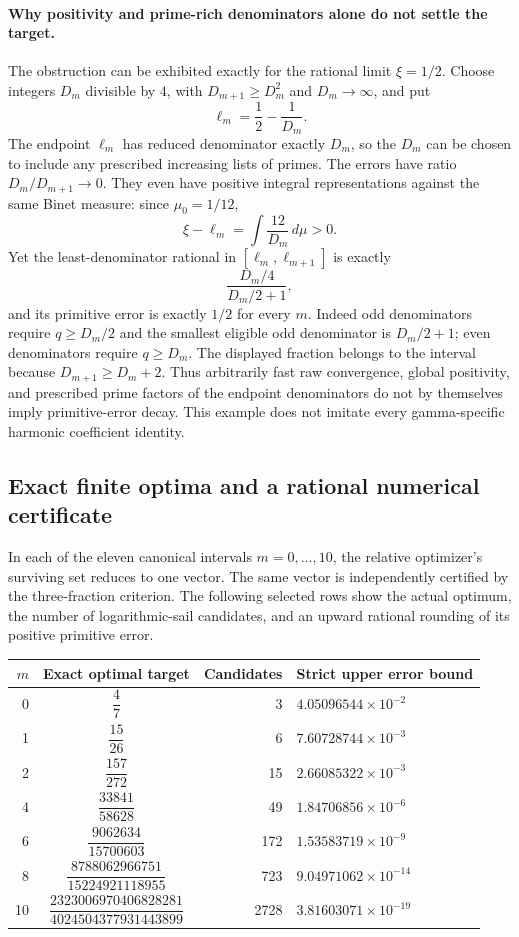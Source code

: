 \documentclass[11pt,a4paper]{article}
\theoremstyle{definition}
\theoremstyle{remark}
\begin{document}
\paragraph{Why positivity and prime-rich denominators alone do not settle the target.}
The obstruction can be exhibited exactly for the rational limit $\xi=1/2$.
Choose integers $D_m$ divisible by $4$, with
$D_{m+1}\ge D_m^2$ and $D_m\to\infty$, and put
\[
 \ell_m=\frac12-\frac1{D_m}.
\]
The endpoint $\ell_m$ has reduced denominator exactly $D_m$, so the
$D_m$ can be chosen to include any prescribed increasing lists of primes.
The errors have ratio $D_m/D_{m+1}\to0$. They even have positive integral
representations against the same Binet measure: since $\mu_0=1/12$,
\[
 \xi-\ell_m=\int\frac{12}{D_m}\,d\mu>0.
\]
Yet the least-denominator rational in
$[\ell_m,\ell_{m+1}]$ is exactly
\[
 \frac{D_m/4}{D_m/2+1},
\]
and its primitive error is exactly $1/2$ for every $m$.
Indeed odd denominators require $q\ge D_m/2$ and the smallest eligible
odd denominator is $D_m/2+1$; even denominators require $q\ge D_m$.
The displayed fraction belongs to the interval because
$D_{m+1}\ge D_m+2$.
Thus arbitrarily fast raw convergence, global positivity, and prescribed
prime factors of the endpoint denominators do not by themselves imply
primitive-error decay. This example does not imitate every
gamma-specific harmonic coefficient identity.



\subsection{Exact finite optima and a rational numerical certificate}
In each of the eleven canonical intervals $m=0,\ldots,10$, the
relative optimizer's surviving set reduces to one vector.
The same vector is independently certified by the three-fraction
criterion. The following selected rows show the actual optimum,
the number of logarithmic-sail candidates, and an upward rational
rounding of its positive primitive error.

\begin{center}
\small
\renewcommand{\arraystretch}{1.55}
\begin{tabular}{@{}rcrl@{}}
\toprule
$m$ & Exact optimal target & Candidates & Strict upper error bound\\
\midrule
0 & $\dfrac{4}{7}$ & 3 & $4.05096544\times10^{-2}$ \\[3pt]
1 & $\dfrac{15}{26}$ & 6 & $7.60728744\times10^{-3}$ \\[3pt]
2 & $\dfrac{157}{272}$ & 15 & $2.66085322\times10^{-3}$ \\[3pt]
4 & $\dfrac{33841}{58628}$ & 49 & $1.84706856\times10^{-6}$ \\[3pt]
6 & $\dfrac{9062634}{15700603}$ & 172 & $1.53583719\times10^{-9}$ \\[3pt]
8 & $\dfrac{8788062966751}{15224921118955}$ & 723 & $9.04971062\times10^{-14}$ \\[3pt]
10 & $\dfrac{2323006970406828281}{4024504377931443899}$ & 2728 & $3.81603071\times10^{-19}$ \\[3pt]
\bottomrule
\end{tabular}
\normalsize
\end{center}
\end{document}
